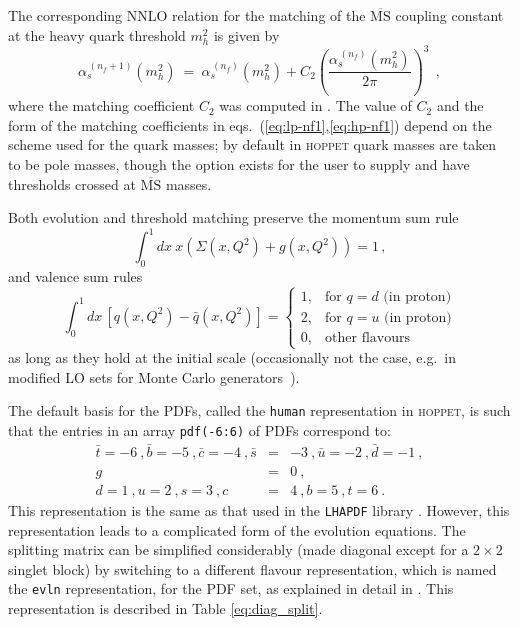 \documentclass[12pt]{article}
\newcommand{\bea}{\begin{eqnarray}}
\newcommand{\eea}{\end{eqnarray}}
\newcommand{\lp}{\left(}
\newcommand{\rp}{\right)}
\newcommand{\nf}{n_f)}
\newcommand{\nn}{\nonumber}
\newcommand{\as}{\alpha_s}
\newcommand{\eg}{e.g.\ }
\newcommand{\MSbar}{\overline{\mathrm{MS}}}
\newcommand{\hoppet}{\textsc{hoppet}\xspace}
\newcommand{\ttt}[1]{\texttt{#1}}
\begin{document}
The corresponding NNLO relation for the matching of the $\MSbar$
coupling constant at the heavy quark threshold $m^2_h$ is given by 
\begin{equation}
\label{eq:as-nf1}
  \as^{\, (n_f+1)}(m_h^2) \: = \:
  \as^{\, (\nf} (m_h^2) +   C_2 \lp \frac{\as^{\, (\nf} (m_h^2)}{2\pi} \rp^3
   \:\: ,
\end{equation}
where the matching coefficient $C_2$ was computed in \cite{Chetyrkin:1997sg}.
%
The value of $C_2$ and the form of the matching coefficients in
eqs.~(\ref{eq:lp-nf1},\ref{eq:hp-nf1}) depend on the scheme used for
the quark masses; by default in \hoppet quark masses are taken to be
pole masses, though the option exists for the user to supply and have
thresholds crossed at $\MSbar$ masses.

Both evolution and threshold matching preserve the momentum sum rule
\begin{equation}
  \int_0^1 dx~x \lp \Sigma(x,Q^2)+g(x,Q^2)\rp =1 \,,
\end{equation}
and valence sum rules
\begin{equation}
  \int_0^1 dx\, \left[q(x,Q^2)-{\bar q}(x,Q^2) \right] = \left\{ 
    \begin{array}{ll}
      1, & \text{for } q = d \text{ (in proton)}\\
      2, & \text{for } q = u \text{ (in proton)}\\
      0, & \text{other flavours}
    \end{array}
    \right.
\end{equation}
as long as they hold at the initial scale (occasionally not the case,
\eg in modified LO sets for Monte Carlo
generators~\cite{Sherstnev:2008dm}).

The default basis for the PDFs, called the \ttt{human} 
representation in \hoppet, is such that 
 the entries in an array
\ttt{pdf(-6:6)} of PDFs correspond to:
\bea 
\bar t={-6} \ ,  \bar b={-5} \ ,  \bar c={-4}
\ , \nn   \bar s&=&{-3} \ , \nn  \bar u={-2} \ , \nn
 \bar d={-1} \ , \\  g&=&{0} \ , \\ \nn   d={1} \ , \nn  u={2} 
\ , \nn  
s={3} \ , \nn   c&=&{4} \ , \nn b={5} \ , \nn  t={6} \ . \nn 
\eea
 This representation is the
same as that used in the \ttt{LHAPDF} library \cite{LHAPDF}. 
However, this representation leads
to a complicated form of the evolution equations.
The splitting matrix can be simplified considerably (made diagonal
except for a $2\times2$ singlet block) by switching to a different
flavour representation, which is named
the \ttt{evln} representation, for the PDF set, as explained in detail in
\cite{vanNeerven:1999ca,vanNeerven:2000uj}. This representation
is described in Table \ref{eq:diag_split}.
\end{document}
